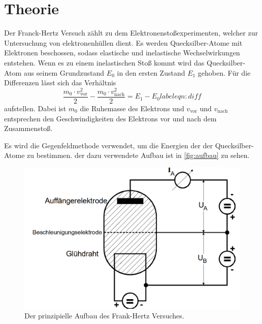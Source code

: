 \section{Theorie}
\label{sec:theorie}

Der Franck-Hertz Versuch zählt zu dem Elektronenstoßexperimenten, welcher zur Untersuchung von elektronenhüllen dient.
Es werden Quecksilber-Atome mit Elektronen beschossen, sodass elastische und inelastische Wechselwirkungen entstehen.
Wenn es zu einem inelastischen Stoß kommt wird das Quecksilber-Atom aus seinem Grundzustand $E_0$ in den 
ersten Zustand $E_1$ gehoben. Für die Differenzen lässt sich das Verhältnis 
\begin{equation}
    \frac{m_0 \cdot v_{\text{vor}}^2}{2} - \frac{m_0 \cdot v_{\text{nach}}^2}{2} = E_1 - E_0
    label{eqn:diff}
\end{equation}
aufstellen. Dabei ist $m_0$ die Ruhemasse des Elektrons und $v_{\text{vor}}$ und $v_{\text{nach}}$ entsprechen den Geschwindigkeiten
des Elektrons vor und nach dem Zusammenstoß.

Es wird die Gegenfeldmethode verwendet, um die Energien der der Quecksilber-Atome zu bestimmen. 
der dazu verwendete Aufbau ist in \autoref{fig:aufbau} zu sehen.

\begin{figure}[H]
	\centering
	\includegraphics[width=0.75\linewidth]{content/grafik/aufbau.png}
	\caption{Der prinzipielle Aufbau des Frank-Hertz Versuches. \cite{franck}}
	\label{fig:aufbau}
\end{figure}


